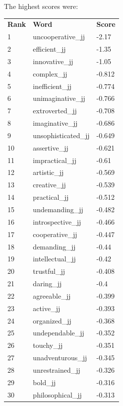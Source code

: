 \documentclass[10pt,letterpaper]{book}
\begin{document}
The highest scores were:
\begin{tabular}{ l l l }
        \textbf{Rank} & \textbf{Word} & \textbf{Score} \\
        1 & uncooperative\_jj & -2.17 \\
        2 & efficient\_jj & -1.35 \\
        3 & innovative\_jj & -1.05 \\
        4 & complex\_jj & -0.812 \\
        5 & inefficient\_jj & -0.774 \\
        6 & unimaginative\_jj & -0.766 \\
        7 & extroverted\_jj & -0.708 \\
        8 & imaginative\_jj & -0.686 \\
        9 & unsophisticated\_jj & -0.649 \\
        10 & assertive\_jj & -0.621 \\
        11 & impractical\_jj & -0.61 \\
        12 & artistic\_jj & -0.569 \\
        13 & creative\_jj & -0.539 \\
        14 & practical\_jj & -0.512 \\
        15 & undemanding\_jj & -0.482 \\
        16 & introspective\_jj & -0.466 \\
        17 & cooperative\_jj & -0.447 \\
        18 & demanding\_jj & -0.44 \\
        19 & intellectual\_jj & -0.42 \\
        20 & trustful\_jj & -0.408 \\
        21 & daring\_jj & -0.4 \\
        22 & agreeable\_jj & -0.399 \\
        23 & active\_jj & -0.393 \\
        24 & organized\_jj & -0.368 \\
        25 & undependable\_jj & -0.352 \\
        26 & touchy\_jj & -0.351 \\
        27 & unadventurous\_jj & -0.345 \\
        28 & unrestrained\_jj & -0.326 \\
        29 & bold\_jj & -0.316 \\
        30 & philosophical\_jj & -0.313 \\
\end{tabular}
\end{document}
